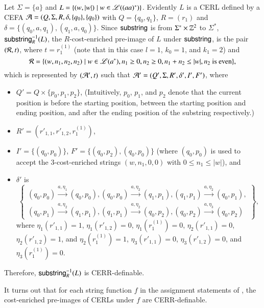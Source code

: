 \begin{example}[$\substring^{-1}_R(L)$]\label{exm:pre-image}
Let $\Sigma = \{a\}$ and $L = \{(w, |w|) \mid w \in \mathscr{L}((aa)^*) \}$. Evidently $L$  is a CERL defined by a CEFA $\mathcal{A} = (Q, \Sigma, R, \delta, \{q_0\}, \{q_0\})$ with $Q=\{q_0,q_1\}$, $R=(r_1)$ and $\delta = \{(q_0, a, q_1), (q_1, a, q_0)\}$. Since $\mathsf{substring}$  is  from $\Sigma^* \times \mathbb{Z}^2$ to $\Sigma^*$, $\substring^{-1}_R(L)$, the $R$-cost-enriched pre-image of $L$ under $\mathsf{substring}$, is the pair $(\mathcal{R}, t)$, where $t=r^{(1)}_1$ (note that in this case $l=1$, $k_0=1$, and $k_1=2$) and 
%
$$\mathcal{R} = \{(w, n_1, n_2, n_2) \mid w \in \mathscr{L}(a^*), n_1 \ge 0, n_2 \ge 0, n_1+n_2 \le |w|, n_2 \mbox{ is even}\},$$ 
%
which is represented by $(\mathcal{A}', t)$ such that $\mathcal{A}'= (Q', \Sigma, R', \delta', I', F')$, where 
\begin{itemize}
\item $Q' = Q \times \{p_0, p_1, p_2\}$, (Intuitively, $p_0$, $p_1$, and $p_2$ denote that the current position is before the starting position, between the starting position and ending position, and after the ending position of the substring respectively.) 
\item $R'= \left(r'_{1,1}, r'_{1,2}, r^{(1)}_1 \right)$, 
\item $I' =\{(q_0,p_0)\}$, $F'=\{(q_0, p_2), (q_0, p_0)\}$ (where $(q_0, p_0)$ is used to accept the $3$-cost-enriched strings $(w, n_1, 0, 0)$ with $0 \le n_1 \le |w|$), and 
\item $\delta'$ is  
\[
\left\{
\begin{array}{l}
(q_0, p_0) \xrightarrow{a, \eta_1} (q_0, p_0), (q_0, p_0) \xrightarrow{a, \eta_2} (q_1, p_1), (q_1, p_1) \xrightarrow{a, \eta_2} (q_0, p_1), \\
(q_0, p_1) \xrightarrow{a, \eta_2} (q_1, p_1), (q_1, p_1) \xrightarrow{a, \eta_2} (q_0, p_2), (q_0, p_2) \xrightarrow{a, \eta_3} (q_0, p_2)
\end{array}
\right\},
\] 
where $\eta_1(r'_{1,1})=1$, $\eta_1(r'_{1,2})=0$, $\eta_1(r^{(1)}_1)=0$, $\eta_2(r'_{1,1})=0$, $\eta_2(r'_{1,2})=1$, and $\eta_2(r^{(1)}_1)=1$, $\eta_3(r'_{1,1})=0$, $\eta_3(r'_{1,2})=0$, and $\eta_3(r^{(1)}_1)=0$.
\end{itemize}
%
Therefore, $\substring^{-1}_R(L)$ is CERR-definable.
\end{example}


It turns out that for each string function $f$ in the assignment statements of {\slint}, the cost-enriched pre-images of CERLs under $f$ are CERR-definable.

